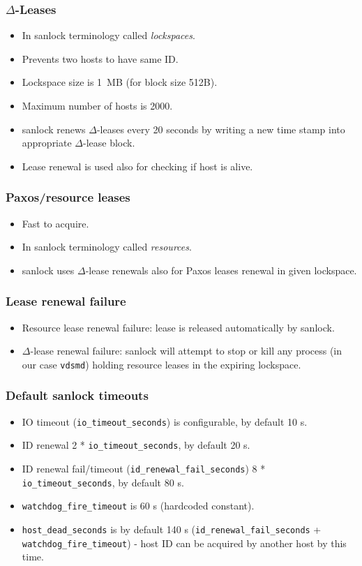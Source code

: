 \documentclass[10pt,utf8]{beamer}
\begin{document}
\begin{frame}
    \frametitle{$\Delta$-Leases}
  \begin{itemize}
    \item In sanlock terminology called \textit{lockspaces}.
    \item Prevents two hosts to have same ID.
    \item Lockspace size is 1~MB (for block size 512B).
    \item Maximum number of hosts is 2000.
    \item sanlock renews $\Delta$-leases every 20 seconds by writing a new time stamp into appropriate $\Delta$-lease block.
    \item Lease renewal is used also for checking if host is alive.
  \end{itemize}
\end{frame}

\begin{frame}
  \frametitle{Paxos/resource leases}
  \begin{itemize}
    \item Fast to acquire.
    \item In sanlock terminology called \textit{resources}.
    \item sanlock uses $\Delta$-lease renewals also for Paxos leases renewal in given lockspace.
  \end{itemize}
\end{frame}

\begin{frame}
  \frametitle{Lease renewal failure}
  \begin{itemize}
    \item Resource lease renewal failure: lease is released automatically by sanlock.
    \item $\Delta$-lease renewal failure: sanlock will attempt to stop or kill any process (in our case \texttt{vdsmd}) holding resource leases in the expiring lockspace.
  \end{itemize}
\end{frame}

\begin{frame}
  \frametitle{Default sanlock timeouts}
  \begin{itemize}
    \item IO timeout (\texttt{io\_timeout\_seconds}) is configurable,  by default 10 s.
    \item ID renewal 2 * \texttt{io\_timeout\_seconds}, by default 20 s.
    \item ID renewal fail/timeout (\texttt{id\_renewal\_fail\_seconds}) 8 * \texttt{io\_timeout\_seconds}, by default 80 s.
  \end{itemize}
  \vspace{0.5cm}
  \begin{itemize}
    \item \texttt{watchdog\_fire\_timeout} is 60 s (hardcoded constant).
    \item \texttt{host\_dead\_seconds} is by default 140 s (\texttt{id\_renewal\_fail\_seconds} + \texttt{watchdog\_fire\_timeout}) - host ID can be acquired by another host by this time.
  \end{itemize}
\end{frame}
\end{document}
